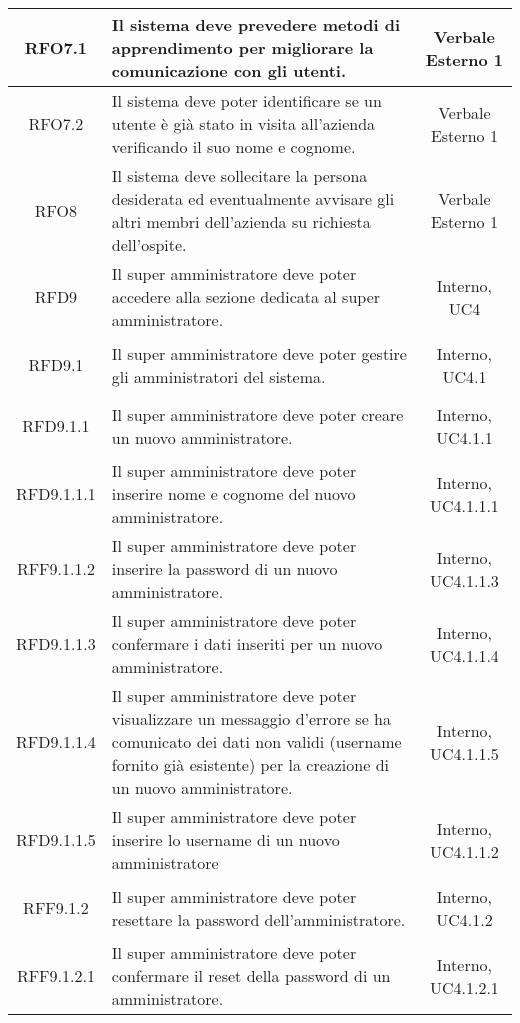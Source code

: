\begin{longtable}{|c|>{\centering}m{7cm}|c|}
	\hypertarget{RFO7.1}{RFO7.1} & Il sistema deve prevedere metodi di apprendimento per migliorare la comunicazione con gli utenti. & Verbale Esterno 1\\ \hline
	\hypertarget{RFO7.2}{RFO7.2} & Il sistema deve poter identificare se un utente è già stato in visita all'azienda verificando il suo nome e cognome. & Verbale Esterno 1\\ \hline
	\hypertarget{RFO8}{RFO8} & Il sistema deve sollecitare la persona desiderata ed eventualmente avvisare gli altri membri dell'azienda su richiesta dell'ospite. & Verbale Esterno 1\\ \hline
	\hypertarget{RFD9}{RFD9} & Il super amministratore deve poter accedere alla sezione dedicata al super amministratore. & Interno, UC4\\ \hline
	\hypertarget{RFD9.1}{RFD9.1} & Il super amministratore deve poter gestire gli amministratori del sistema. & Interno, UC4.1\\ \hline
	\hypertarget{RFD9.1.1}{RFD9.1.1} & Il super amministratore deve poter creare un nuovo amministratore. & Interno, UC4.1.1\\ \hline
	\hypertarget{RFD9.1.1.1}{RFD9.1.1.1} & Il super amministratore deve poter inserire nome e cognome del nuovo amministratore. & Interno, UC4.1.1.1\\ \hline
	\hypertarget{RFF9.1.1.2}{RFF9.1.1.2} & Il super amministratore deve poter inserire la password di un nuovo amministratore. & Interno, UC4.1.1.3\\ \hline
	\hypertarget{RFD9.1.1.3}{RFD9.1.1.3} & Il super amministratore deve poter confermare i dati inseriti per un nuovo amministratore. & Interno, UC4.1.1.4\\ \hline
	\hypertarget{RFD9.1.1.4}{RFD9.1.1.4} & Il super amministratore deve poter visualizzare un messaggio d'errore se ha comunicato dei dati non validi (username fornito già esistente) per la creazione di un nuovo amministratore. & Interno, UC4.1.1.5\\ \hline
	\hypertarget{RFD9.1.1.5}{RFD9.1.1.5} & Il super amministratore deve poter inserire lo username di un nuovo amministratore & Interno, UC4.1.1.2\\ \hline
	\hypertarget{RFF9.1.2}{RFF9.1.2} & Il super amministratore deve poter resettare la password dell'amministratore. & Interno, UC4.1.2\\ \hline
	\hypertarget{RFF9.1.2.1}{RFF9.1.2.1} & Il super amministratore deve poter confermare il reset della password di un amministratore. & Interno, UC4.1.2.1\\ \hline

\end{longtable}
